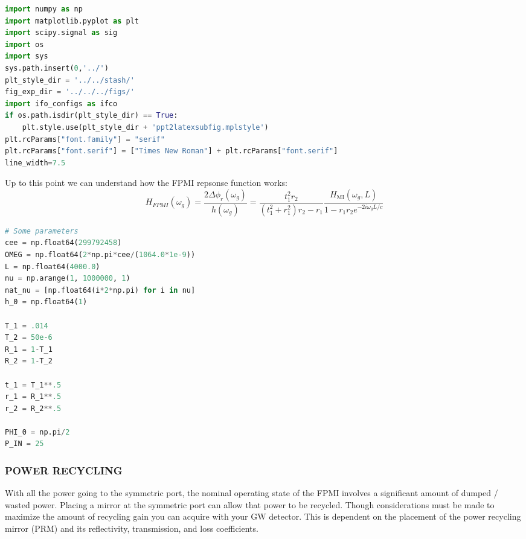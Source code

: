\begin{spacing}{1.2}\begin{lstlisting}[frame=single, language=Python]
import numpy as np 
import matplotlib.pyplot as plt
import scipy.signal as sig
import os 
import sys
sys.path.insert(0,'../')
plt_style_dir = '../../stash/'
fig_exp_dir = '../../../figs/'
import ifo_configs as ifco
if os.path.isdir(plt_style_dir) == True:
    plt.style.use(plt_style_dir + 'ppt2latexsubfig.mplstyle')
plt.rcParams["font.family"] = "serif"
plt.rcParams["font.serif"] = ["Times New Roman"] + plt.rcParams["font.serif"]
line_width=7.5
\end{lstlisting}\end{spacing}

Up to this point we can understand how the FPMI repsonse function works:
\begin{equation} H_{FPMI}(\omega_g) = \frac{2 \Delta \phi_r(\omega_g)}{h(\omega_g)} =  \frac{t_1^2r_2}{(t_1^2 + r_1^2)r_2 -r_1} \frac{H_{\mathrm{MI}}(\omega_g, L)}{1-r_1r_2e^{-2i \omega_g L /c }}  \end{equation}

\begin{spacing}{1.2}\begin{lstlisting}[frame=single, language=Python]
# Some parameters
cee = np.float64(299792458)
OMEG = np.float64(2*np.pi*cee/(1064.0*1e-9))
L = np.float64(4000.0)
nu = np.arange(1, 1000000, 1)
nat_nu = [np.float64(i*2*np.pi) for i in nu]
h_0 = np.float64(1)

T_1 = .014
T_2 = 50e-6
R_1 = 1-T_1
R_2 = 1-T_2

t_1 = T_1**.5
r_1 = R_1**.5
r_2 = R_2**.5 

PHI_0 = np.pi/2 
P_IN = 25
\end{lstlisting}\end{spacing}

\subsubsection*{POWER RECYCLING}

With all the power going to the symmetric port, the nominal operating
state of the FPMI involves a significant amount of dumped / wasted
power. Placing a mirror at the symmetric port can allow that power to be
recycled. Though considerations must be made to maximize the amount of
recycling gain you can acquire with your GW detector. This is dependent
on the placement of the power recycling mirror (PRM) and its
reflectivity, transmission, and loss coefficients.

